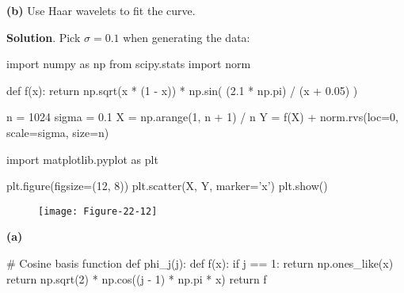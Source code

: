\textbf{(b)} Use Haar wavelets to fit the curve.

\textbf{Solution}. Pick \(\sigma = 0.1\) when generating the data:

\begin{python}
import numpy as np
from scipy.stats import norm

def f(x):
    return np.sqrt(x * (1 - x)) * np.sin( (2.1 * np.pi) / (x + 0.05) )

n = 1024
sigma = 0.1
X = np.arange(1, n + 1) / n
Y = f(X) + norm.rvs(loc=0, scale=sigma, size=n)
\end{python}

\begin{python}
import matplotlib.pyplot as plt

plt.figure(figsize=(12, 8))
plt.scatter(X, Y, marker='x')
plt.show()
\end{python}

\begin{figure}[H]
\centering
\texttt{[image: Figure-22-12]}
\end{figure}

\textbf{(a)}

\begin{python}
# Cosine basis function
def phi_{j}(j):
    def f(x):
        if j == 1:
            return np.ones_like(x)
        return np.sqrt(2) * np.cos((j - 1) * np.pi * x)
    return f
\end{python}


